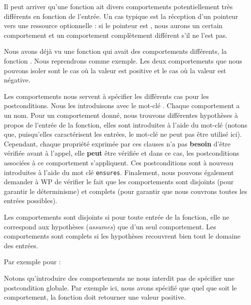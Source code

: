Il peut arriver qu'une fonction ait divers comportements potentiellement très
différents en fonction de l'entrée. Un cas typique est la réception d'un
pointeur vers une ressource optionnelle : si le pointeur est , nous
aurons un certain comportement et un comportement complètement différent s'il ne
l'est pas.



Nous avons déjà vu une fonction qui avait des comportements différents, la
fonction . Nous reprendrons comme exemple. Les deux
comportements que nous pouvons isoler sont le cas où la valeur est positive et
le cas où la valeur est négative.



Les comportements nous servent à spécifier les différents cas pour les
postconditions. Nous les introduisons avec le mot-clé .
Chaque comportement a un nom. Pour un comportement donné, nous trouvons
différentes hypothèses à propos de l'entrée de la fonction, elles sont
introduites à l'aide du mot-clé  (notons que, puisqu'elles
caractérisent les entrées, le mot-clé  ne peut
pas être utilisé ici). Cependant, chaque propriété exprimée par ces clauses
n'a pas \textbf{besoin} d'être vérifiée avant à l'appel, elle \textbf{peut}
être vérifiée et dans ce cas, les postconditions associées à ce comportement
s'appliquent. Ces postconditions sont à nouveau introduites à l'aide du mot
clé \texttt{ensures}. Finalement, nous pouvons également demander à WP
de vérifier le fait que les comportements sont disjoints (pour garantir
le déterminisme) et complets (pour garantir que nous couvrons toutes les
entrées possibles).



Les comportements sont disjoints si pour toute entrée de la fonction, elle ne
correspond aux hypothèses (\textit{assumes}) que d'un seul comportement. Les
comportements sont complets si les hypothèses recouvrent bien tout le domaine
des entrées.



Par exemple pour  :





Notons qu'introduire des comportements ne nous interdit pas de spécifier une
postcondition globale. Par exemple ici, nous avons spécifié que quel que soit
le comportement, la fonction doit retourner une valeur positive.


